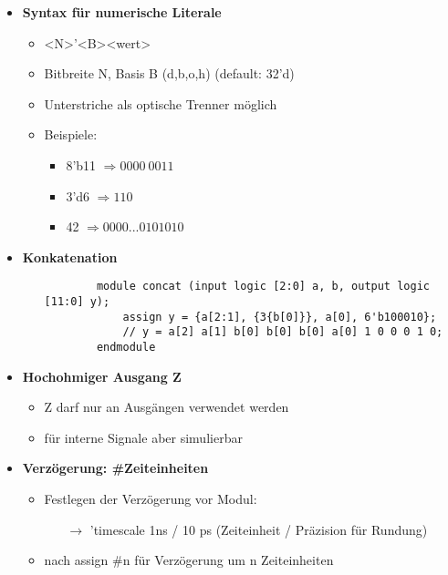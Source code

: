 \begin{itemize}
\item \textbf{Syntax für numerische Literale}
	\begin{itemize}
	\item <N>'<B><wert>
	\item Bitbreite N, Basis B (d,b,o,h) (default: 32'd)
	\item Unterstriche als optische Trenner möglich
	\item Beispiele:
		\begin{itemize}
		\item 8'b11 $\Rightarrow 0000~0011$
		\item 3'd6 $\Rightarrow 110$
		\item 42 $\Rightarrow 0000...0101010$
		\end{itemize}
	\end{itemize}

\item \textbf{Konkatenation}
	\begin{itemize}
	
	\item[]
		\begin{lstlisting}
		module concat (input logic [2:0] a, b, output logic [11:0] y);
			assign y = {a[2:1], {3{b[0]}}, a[0], 6'b100010};
			// y = a[2] a[1] b[0] b[0] b[0] a[0] 1 0 0 0 1 0;
		endmodule		
		\end{lstlisting}
	
	\end{itemize}
	
\item \textbf{Hochohmiger Ausgang Z}
	\begin{itemize}
	\item Z darf nur an Ausgängen verwendet werden
	\item für interne Signale aber simulierbar
	\end{itemize}

\item \textbf{Verzögerung: \#Zeiteinheiten}
	\begin{itemize}
	\item Festlegen der Verzögerung vor Modul: 
		\begin{itemize}
		\item[$\rightarrow$]'timescale 1ns / 10 ps (Zeiteinheit / Präzision für Rundung)
		\end{itemize}
	\item nach assign \#n für Verzögerung um n Zeiteinheiten
	\end{itemize}

\end{itemize}


